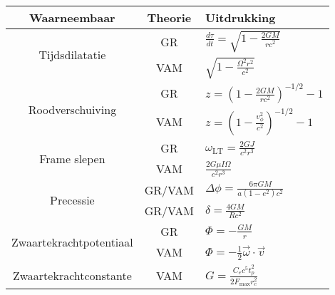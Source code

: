     \begin{tabular}{|c|c|l|}
        \hline
        \textbf{Waarneembaar} & \textbf{Theorie} & \textbf{Uitdrukking} \\
        \hline

        \multirow{2}{*}{Tijdsdilatatie}
        & GR & \( \displaystyle \frac{d\tau}{dt} = \sqrt{1 - \frac{2GM}{rc^2}} \) \\
        & VAM & \( \displaystyle \sqrt{1 - \frac{\Omega^2 r^2}{c^2}} \) \\

        \hline
        \multirow{2}{*}{Roodverschuiving}
        & GR & \( \displaystyle z = \left(1 - \frac{2GM}{rc^2} \right)^{-1/2} - 1 \) \\
        & VAM & \( \displaystyle z = \left(1 - \frac{v_\phi^2}{c^2} \right)^{-1/2} - 1 \) \\

        \hline
        \multirow{2}{*}{Frame slepen}
        & GR & \( \displaystyle \omega_{\text{LT}} = \frac{2GJ}{c^2 r^3} \) \\
        & VAM & \( \displaystyle \frac{2G \mu I \Omega}{c^2 r^3} \) \\

        \hline
        \multirow{2}{*}{Precessie}
        & GR/VAM & \( \displaystyle \Delta\phi = \frac{6\pi GM}{a(1 - e^2)c^2} \) \\

        \hline
        \multirow{2}{*}{Lichtafbuiging}
        & GR/VAM & \( \displaystyle \delta = \frac{4GM}{Rc^2} \) \\

        \hline
        \multirow{2}{*}{Zwaartekrachtpotentiaal}
        & GR & \( \Phi = -\frac{GM}{r} \) \\
        & VAM & \( \Phi = -\frac{1}{2} \vec{\omega} \cdot \vec{v} \) \\

        \hline
        Zwaartekrachtconstante
        & VAM & \( \displaystyle G = \frac{C_e c^5 t_p^2}{2 F_{\max} r_c^2} \) \\
        \hline
    \end{tabular}